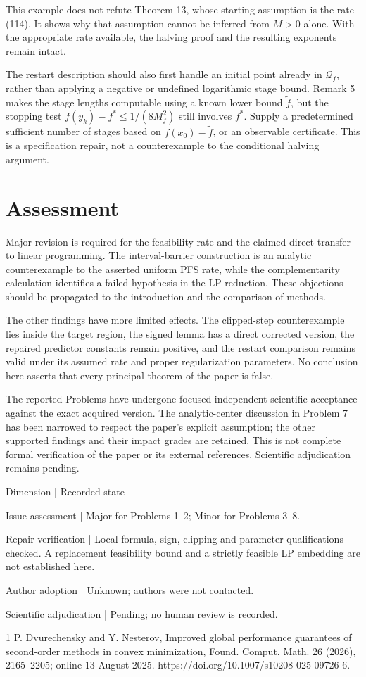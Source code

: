 \documentclass[10pt]{article}
\begin{document}
This example does not refute Theorem 13, whose starting assumption is the rate (114). It shows why that assumption cannot be inferred from \(M>0\) alone. With the appropriate rate available, the halving proof and the resulting exponents remain intact.\par
The restart description should also first handle an initial point already in \(\mathcal Q_f\), rather than applying a negative or undefined logarithmic stage bound. Remark 5 makes the stage lengths computable using a known lower bound \(\widetilde f\), but the stopping test \(f(y_k)-f^\ast\leq1/(8M_f^2)\) still involves \(f^\ast\). Supply a predetermined sufficient number of stages based on \(f(x_0)-\widetilde f\), or an observable certificate. This is a specification repair, not a counterexample to the conditional halving argument.\par
\section*{Assessment}
Major revision is required for the feasibility rate and the claimed direct transfer to linear programming. The interval-barrier construction is an analytic counterexample to the asserted uniform PFS rate, while the complementarity calculation identifies a failed hypothesis in the LP reduction. These objections should be propagated to the introduction and the comparison of methods.\par
The other findings have more limited effects. The clipped-step counterexample lies inside the target region, the signed lemma has a direct corrected version, the repaired predictor constants remain positive, and the restart comparison remains valid under its assumed rate and proper regularization parameters. No conclusion here asserts that every principal theorem of the paper is false.\par
The reported Problems have undergone focused independent scientific acceptance against the exact acquired version. The analytic-center discussion in Problem 7 has been narrowed to respect the paper’s explicit assumption; the other supported findings and their impact grades are retained. This is not complete formal verification of the paper or its external references. Scientific adjudication remains pending.\par
Dimension | Recorded state\par
Issue assessment | Major for Problems 1–2; Minor for Problems 3–8.\par
Repair verification | Local formula, sign, clipping and parameter qualifications checked. A replacement feasibility bound and a strictly feasible LP embedding are not established here.\par
Author adoption | Unknown; authors were not contacted.\par
Scientific adjudication | Pending; no human review is recorded.\par
1 P. Dvurechensky and Y. Nesterov, Improved global performance guarantees of second-order methods in convex minimization, Found. Comput. Math. 26 (2026), 2165–2205; online 13 August 2025. https://doi.org/10.1007/s10208-025-09726-6.\par
\end{document}
